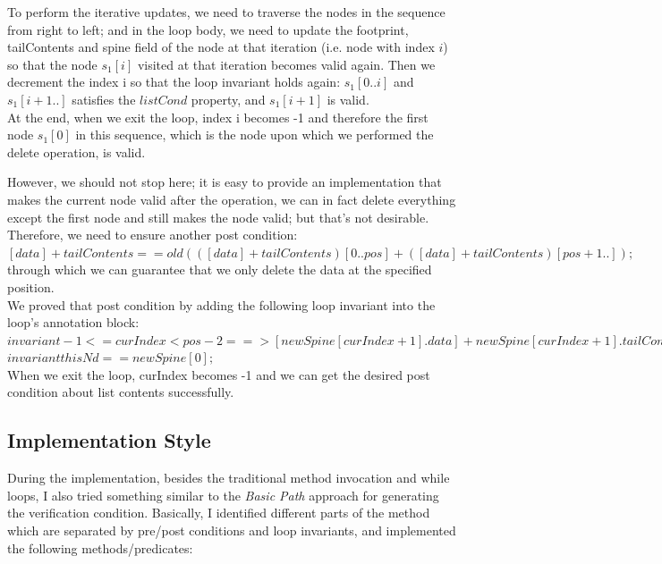 To perform the iterative updates, we need to traverse the nodes in the sequence from right to left; and in the loop body, we need to update the footprint, tailContents and spine field of the node at that iteration (i.e. node with index $i$) so that the node $s_1[i]$ visited at that iteration becomes valid again. Then we decrement the index i so that 
the loop invariant holds again: $s_1[0..i]$ and  $s_1[i+1..]$ satisfies the  $listCond$ property, and $s_1[i+1]$ is valid.\\

At the end, when we exit the loop, index i becomes -1 and therefore the first node $s_1[0]$ in this sequence, which is the node upon which we performed the delete operation, is valid.

\bigskip

However, we should not stop here; it is easy to provide an implementation that makes the current node valid after the operation, we can in fact delete everything except the first node and still makes the node valid; but that's not desirable.
Therefore, we need to ensure another post condition: $[data] + tailContents == old(([data] + tailContents)[0..pos] + ([data] + tailContents)[pos+1..] );$ through which we can guarantee that we only delete the data at the specified position.\\

We proved that post condition by adding the following loop invariant into the loop's annotation block:\\

$invariant -1 <= curIndex < pos - 2 ==>  [newSpine[curIndex+1].data] + newSpine[curIndex+1].tailContents == oldContents[curIndex+1..pos] + oldContents[pos+1..];$\\

$	invariant thisNd == newSpine[0];$\\

When we exit the loop, curIndex becomes -1 and we can get the desired post condition about list contents successfully.

\subsection*{Implementation Style}
During the implementation, besides the traditional method invocation and while loops, I also tried something similar to the \emph{Basic Path} approach for generating the verification condition. Basically, I identified different parts of the method which are separated by pre/post conditions and loop invariants, and implemented the following methods/predicates:\\

